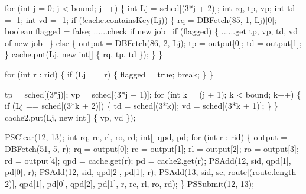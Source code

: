 \documentclass{article}
\def\nwendcode{\endtrivlist \endgroup}
\let\nwdocspar=\par
\theoremstyle{definition}
\begin{document}
for (int j = 0; j < bound; j++) \{
  int Lj = sched[(3*j + 2)];
  int rq, tp, vp;
  int td = -1;
  int vd = -1;
  if (!cache.containsKey(Lj)) \{
    rq = DBFetch(85, 1, Lj)[0];
    boolean flagged = false;
    \LA{}......check if new job~{\nwtagstyle{}}\RA{}
    if (flagged) \{
      \LA{}......get tp, vp, td, vd of new job~{\nwtagstyle{}}\RA{}
    \} else \{
      output = DBFetch(86, 2, Lj);
      tp = output[0];
      td = output[1];
    \}
    cache.put(Lj, new int[] \{ rq, tp, td \});
  \}
\}
\nwendcode{}\nwdocspar
\nwenddocs{}\endmoddef{}
for (int r : rid) \{
  if (Lj == r) \{
    flagged = true;
    break;
  \}
\}
\nwendcode{}\nwdocspar
\nwenddocs{}\endmoddef{}
tp = sched[(3*j)];
vp = sched[(3*j + 1)];
for (int k = (j + 1); k < bound; k++) \{
  if (Lj == sched[(3*k + 2)]) \{
    td = sched[(3*k)];
    vd = sched[(3*k + 1)];
  \}
\}
cache2.put(Lj, new int[] \{ vp, vd \});
\nwendcode{}\nwdocspar
\nwenddocs{}\endmoddef{}
PSClear(12, 13);
int rq, re, rl, ro, rd;
int[] qpd, pd;
for (int r : rid) \{
  output = DBFetch(51, 5, r);
  rq = output[0];
  re = output[1];
  rl = output[2];
  ro = output[3];
  rd = output[4];
  qpd = cache.get(r);
  pd = cache2.get(r);
  PSAdd(12, sid, qpd[1], pd[0], r);
  PSAdd(12, sid, qpd[2], pd[1], r);
  PSAdd(13, sid, se, route[(route.length - 2)], qpd[1], pd[0], qpd[2], pd[1],
        r, re, rl, ro, rd);
\}
PSSubmit(12, 13);
\nwendcode{}\nwdocspar
\end{document}
